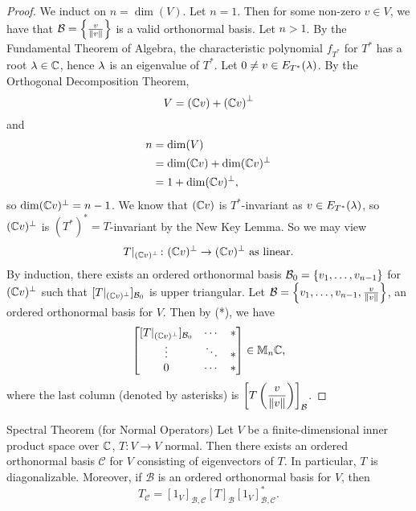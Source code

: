 \documentclass[class=article, crop=false]{standalone}
\begin{document}
  \begin{proof}
    We induct on $n = \dim(V)$. Let $n = 1$. Then for some non-zero $v\in V$, we have that $\mathcal{B} = \left\{\frac{v}{\left\lVert v\right\rVert}\right\}$ is a valid orthonormal basis. Let $n > 1$. By the Fundamental Theorem of Algebra, the characteristic polynomial $f_{T^*}$ for $T^*$ has a root $\lambda\in \mathbb{C}$, hence $\lambda$ is an eigenvalue of $T^*$. Let $0\neq v\in E_{T^*}(\lambda)$. By the Orthogonal Decomposition Theorem, 
    \[
      V = (\mathbb{C} v) + \left( \mathbb{C} v \right)^\perp
    \]
    and
    \begin{align*}
      n &= \dim(V) \\
        &= \dim(\mathbb{C} v) + \dim(\mathbb{C} v)^\perp \\
        &= 1 + \dim(\mathbb{C} v)^\perp,
    \end{align*}
    so $\dim(\mathbb{C} v)^\perp = n - 1$. We know that $(\mathbb{C} v)$ is $T^*$-invariant as $v\in E_{T^*}(\lambda)$, so $(\mathbb{C} v)^\perp$ is $(T^*)^* = T$-invariant by the New Key Lemma. So we may view
    \[
      T|_{(\mathbb{C} v)^\perp}\colon (\mathbb{C} v)^\perp\to (\mathbb{C} v)^\perp \text{ as linear.}
    \]
    By induction, there exists an ordered orthonormal basis $\mathcal{B}_0 = \left\{v_1,\dotsc,v_{n-1}\right\}$ for $(\mathbb{C} v)^\perp$ such that $[T|_{(\mathbb{C} v)^\perp}]_{\mathcal{B}_0}$ is upper triangular. Let $\mathcal{B} = \left\{v_1,\dotsc,v_{n-1}, \frac{v}{\left\lVert v\right\rVert}\right\}$, an ordered orthonormal basis for $V$. Then by (*), we have
    \[
      \begin{bmatrix}
        [T|_{(\mathbb{C} v)^\perp}]_{\mathcal{B}_0} & \cdots & * \\
        \vdots & \ddots & * \\
        0 & \cdots & *
      \end{bmatrix} \in \mathbb{M}_n\mathbb{C},
    \]
    where the last column (denoted by asterisks) is $\left[T \left( \dfrac{v}{\left\lVert v\right\rVert} \right)\right]_{\mathcal{B}}$.
  \end{proof}
  \newpage
  \begin{theorem}{Spectral Theorem (for Normal Operators)}
    Let $V$ be a finite-dimensional inner product space over $\mathbb{C}$, $T\colon V\to V$ normal. Then there exists an ordered orthonormal basis $\mathcal{C}$ for $V$ consisting of eigenvectors of $T$. In particular, $T$ is diagonalizable. Moreover, if $\mathcal{B}$ is an ordered orthonormal basis for $V$, then
    \[
      T_{\mathcal{C}} = [1_V]_{\mathcal{B},\mathcal{C}}[T]_{\mathcal{B}}[1_V]_{\mathcal{B},\mathcal{C}}^*.
    \]
  \end{theorem}
\end{document}
